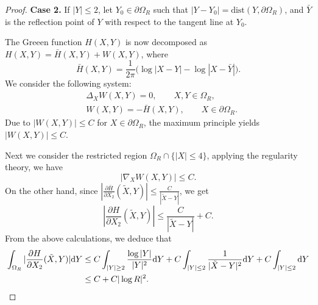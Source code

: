 \documentclass[11pt,reqno]{amsart}%
\theoremstyle{definition}
\theoremstyle{remark}
\begin{document}
\begin{proof}
{\bf Case 2.} If $|Y|\leq 2$, let $Y_{0} \in \partial\Omega_{R}$ such that $|Y-Y_{0}|=\text{dist} (Y,\partial\Omega_{R})$, and $\bar{Y}$ is the reflection point of $Y$
with respect to  the tangent line at $Y_{0}$.

The Greeen function $H(X,Y)$ is now decomposed as $H(X,Y)=\bar{H}(X,Y)+W(X,Y)$, where
$$\bar{H}(X,Y)=\frac{1}{2\pi}\big(\log|X-Y|-\log|X-\bar{Y}|\big).$$
We consider the  following system:
\begin{align}
&\Delta_{X}W(X,Y)=0,\qquad X,Y\in\Omega_{R},\nonumber\\
&W(X,Y)=-\bar{H}(X,Y),\qquad   X\in\partial\Omega_{R}.\nonumber
\end{align}
Due to $|W(X,Y)|\leq C$ for $X\in\partial \Omega_{R}$, the maximum principle  yields
$|W(X,Y)|\leq C.$

Next we consider the restricted region $\Omega_{R}\cap\{|X|\leq 4\} $, applying the regularity theory, we have
$$|\nabla_{X}W(X,Y)|\leq C.$$
On the other hand, since $|\frac{\partial \bar{H}}{\partial X_{2}}(\tilde{X},Y)|\leq\frac{ C}{|\tilde{X}-Y|}$, we get
$$|\frac{\partial H}{\partial X_{2}}(\tilde{X},Y)|\leq\frac{ C}{|\tilde{X}-Y|}+C.$$
%
From the above calculations, we deduce that
\begin{align}
\int_{\Omega_{R}}|\frac{\partial H}{\partial X_{2}}(\tilde{X},Y)|{\rm d}Y
&\leq C \int_{|Y|\geq 2}\frac{\log |Y|}{|Y|^{2}}{\rm d}Y+ C \int_{|Y|\leq 2}\frac{1}{|\tilde{X}-Y|^{2}}{\rm d}Y+ C \int_{|Y|\leq 2}{\rm d}Y \nonumber \\
&\leq C +C |\log R|^{2}.\nonumber
\end{align}
\end{proof}
\end{document}
